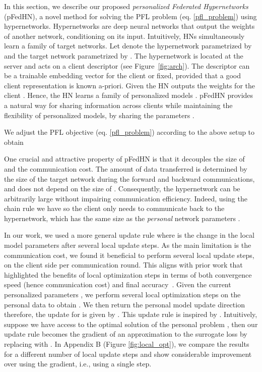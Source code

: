 \documentclass{article}
\newcommand\ourmethod{pFedHN}
\begin{document}
In this section,  we describe our proposed \textit{personalized Federated Hypernetworks} (\ourmethod{}), a novel method for solving the PFL problem (eq. \ref{pfl_problem}) using hypernetworks.
Hypernetworks are deep neural networks that output the weights of another network, conditioning on its input. Intuitively, HNs simultaneously learn a family of target networks.
Let  denote the hypernetwork parametrized by  and  the target network parametrized by . 
The hypernetwork is located at the server and acts on a client descriptor  (see Figure~\ref{fig:arch}). The descriptor can be a trainable embedding vector for the client or fixed, provided that a good client representation is known a-priori. Given  the HN outputs the weights for the  client . Hence, the HN  learns a family of personalized models . \ourmethod{} provides a natural way for sharing information across clients while maintaining the flexibility of personalized models, by sharing the parameters .

We adjust the PFL objective (eq. \ref{pfl_problem}) according to the above setup to obtain


One crucial and attractive property of \ourmethod{} is that it decouples the size of  and the communication cost. The amount of data transferred is determined by the size of the target network during the forward and backward communications, and does not depend on the size of . Consequently, the hypernetwork can be arbitrarily large without impairing communication efficiency. Indeed, using the chain rule we have  so the client only needs to communicate  back to the hypernetwork, which has the same size as the \textit{personal} network parameters . 

In our work, we used a more general update rule  where  is the change in the local model parameters after several local update steps. As the main limitation is the communication cost, we found it beneficial to perform several local update steps, on the client side per communication round. This aligns with prior work that highlighted the benefits of local optimization steps in terms of both convergence speed (hence communication cost) and final accuracy~\cite{McMahan2017CommunicationEfficientLO,huo2020faster}.
Given the current personalized parameters , we perform several  local optimization steps on the personal data to obtain . We then return the personal model update direction  therefore, the update for  is given by . This update rule is inspired by  \citet{zhang2019lookahead}. Intuitively, suppose we have access to the optimal solution of the personal problem , then our update rule becomes the gradient of an approximation to the surrogate loss  by replacing  with . In Appendix B (Figure \ref{fig:local_opt}), 
we compare the results for a different number of local update steps and show considerable improvement over using the gradient, i.e., using a single step.
\end{document}
